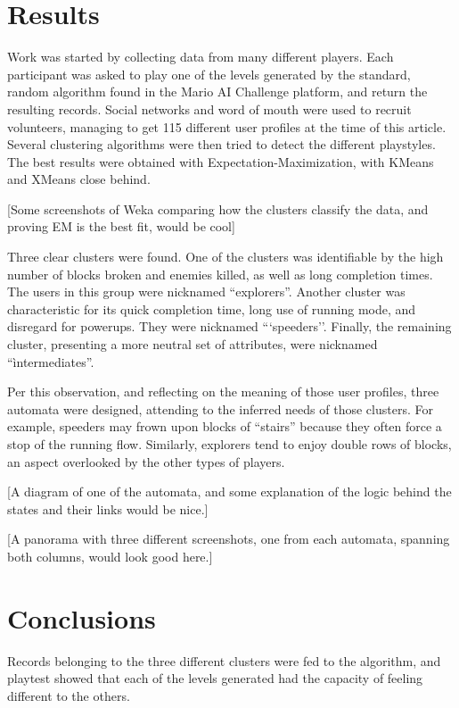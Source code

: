 \documentclass[conference]{IEEEtran}
\begin{document}
\section{Results}

Work was started by collecting data from many different players. Each participant was asked to play one of the levels generated by the standard, random algorithm found in the Mario AI Challenge platform, and return the resulting records. Social networks and word of mouth were used to recruit volunteers, managing to get 115 different user profiles at the time of this article. Several clustering algorithms were then tried to detect the different playstyles. The best results were obtained with Expectation-Maximization, with KMeans and XMeans close behind. 

[Some screenshots of Weka comparing how the clusters classify the data, and proving EM is the best fit, would be cool]

Three clear clusters were found. One of the clusters was identifiable by the high number of blocks broken and enemies killed, as well as long completion times. The users in this group were nicknamed ``explorers''. Another cluster was characteristic for its quick completion time, long use of running mode, and disregard for powerups. They were nicknamed ```speeders''. Finally, the remaining cluster, presenting a more neutral set of attributes, were nicknamed ``ìntermediates''.

Per this observation, and reflecting on the meaning of those user profiles, three automata were designed, attending to the inferred needs of those clusters. For example, speeders may frown upon blocks of ``stairs'' because they often force a stop of the running flow. Similarly, explorers tend to enjoy double rows of blocks, an aspect overlooked by the other types of players. 

[A diagram of one of the automata, and some explanation of the logic behind the states and their links would be nice.]

[A panorama with three different screenshots, one from each automata, spanning both columns, would look good here.]

\section{Conclusions}

Records belonging to the three different clusters were fed to the algorithm, and playtest showed that each of the levels generated had the capacity of feeling different to the others.
\end{document}
